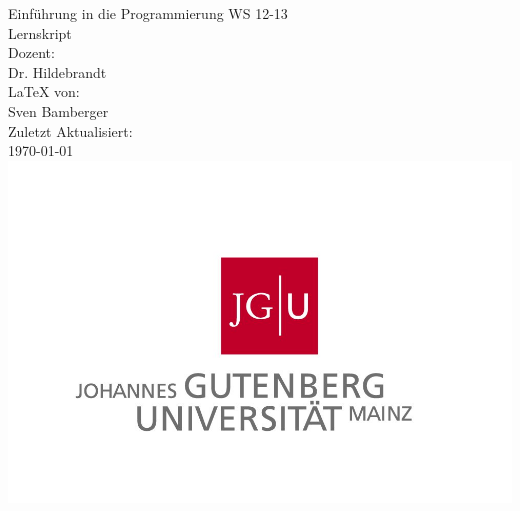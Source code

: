 \begin{titlepage}
\center
\Large Einführung in die Programmierung WS 12-13\large \\[2em]
Lernskript \\[2em]
Dozent:\\Dr. Hildebrandt\\[2em]
\LaTeX{} von:\\Sven Bamberger\\[2em]
Zuletzt Aktualisiert:\\\today\\
\includegraphics[scale=.2]{front/pics/Logo.jpg}\\\quad\\
\end{titlepage}
